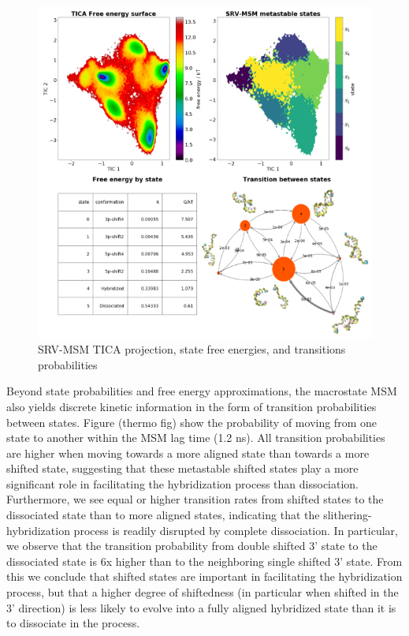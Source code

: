 \documentclass[journal=jpcbfk,manuscript=article]{achemso}
\begin{document}
\begin{figure}[ht!]
	\begin{center}
        \includegraphics[width=\textwidth]{Figs/figs_0804/AT-all_thermo.png}
        \caption{SRV-MSM TICA projection, state free energies, and transitions probabilities}
        \label{fig:AT-all_thermo}
	\end{center}
\end{figure}

Beyond state probabilities and free energy approximations, the macrostate MSM also yields discrete kinetic information in the form of transition probabilities between states. Figure (thermo fig) show the probability of moving from one state to another within the MSM lag time (1.2 ns). All transition probabilities are higher when moving towards a more aligned state than towards a more shifted state, suggesting that these metastable shifted states play a more significant role in facilitating the hybridization process than dissociation. Furthermore, we see equal or higher transition rates from shifted states to the dissociated state than to more aligned states, indicating that the slithering-hybridization process is readily disrupted by complete dissociation. In particular, we observe that the transition probability from double shifted 3' state to the dissociated state is 6x higher than to the neighboring single shifted 3' state. From this we conclude that shifted states are important in facilitating the hybridization process, but that a higher degree of shiftedness (in particular when shifted in the 3' direction) is less likely to evolve into a fully aligned hybridized state than it is to dissociate in the process.
\end{document}
